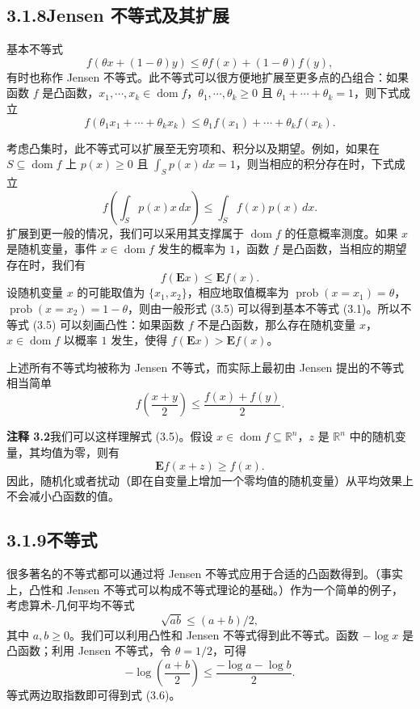 \documentclass[UTF8, 12pt, fontset=fandol, oneside]{ctexart}
\DeclareMathOperator{\dom}{dom}
\begin{document}
\subsection*{3.1.8\quad Jensen 不等式及其扩展}

基本不等式
\[
f(\theta x+(1-\theta)y)\leq \theta f(x)+(1-\theta)f(y),
\]
有时也称作 Jensen 不等式。此不等式可以很方便地扩展至更多点的凸组合：如果函数 $f$ 是凸函数，$x_1,\cdots,x_k\in\dom f$，$\theta_1,\cdots,\theta_k\geq0$ 且 $\theta_1+\cdots+\theta_k=1$，则下式成立
\[
f(\theta_1x_1+\cdots+\theta_kx_k)\leq \theta_1 f(x_1)+\cdots+\theta_k f(x_k).
\]

考虑凸集时，此不等式可以扩展至无穷项和、积分以及期望。例如，如果在 $S\subseteq\dom f$ 上 $p(x)\geq0$ 且 $\int_S p(x)\,dx=1$，则当相应的积分存在时，下式成立
\[
f\left(\int_S p(x)x\,dx\right)\leq \int_S f(x)p(x)\,dx.
\]
扩展到更一般的情况，我们可以采用其支撑属于 $\dom f$ 的任意概率测度。如果 $x$ 是随机变量，事件 $x\in\dom f$ 发生的概率为 $1$，函数 $f$ 是凸函数，当相应的期望存在时，我们有
\begin{equation}
f(\mathbf{E}x)\leq \mathbf{E}f(x).
\tag{3.5}
\end{equation}
设随机变量 $x$ 的可能取值为 $\{x_1,x_2\}$，相应地取值概率为 $\operatorname{prob}(x=x_1)=\theta$，$\operatorname{prob}(x=x_2)=1-\theta$，则由一般形式 (3.5) 可以得到基本不等式 (3.1)。所以不等式 (3.5) 可以刻画凸性：如果函数 $f$ 不是凸函数，那么存在随机变量 $x$，$x\in\dom f$ 以概率 $1$ 发生，使得 $f(\mathbf{E}x)>\mathbf{E}f(x)$。

上述所有不等式均被称为 Jensen 不等式，而实际上最初由 Jensen 提出的不等式相当简单
\[
f\left(\frac{x+y}{2}\right)\leq \frac{f(x)+f(y)}{2}.
\]

\noindent\textbf{注释 3.2}\quad 我们可以这样理解式 (3.5)。假设 $x\in\dom f\subseteq\mathbb{R}^n$，$z$ 是 $\mathbb{R}^n$ 中的随机变量，其均值为零，则有
\[
\mathbf{E}f(x+z)\geq f(x).
\]
因此，随机化或者扰动（即在自变量上增加一个零均值的随机变量）从平均效果上不会减小凸函数的值。

\subsection*{3.1.9\quad 不等式}

很多著名的不等式都可以通过将 Jensen 不等式应用于合适的凸函数得到。（事实上，凸性和 Jensen 不等式可以构成不等式理论的基础。）作为一个简单的例子，考虑算术-几何平均不等式
\begin{equation}
\sqrt{ab}\leq (a+b)/2,
\tag{3.6}
\end{equation}
其中 $a,b\geq0$。我们可以利用凸性和 Jensen 不等式得到此不等式。函数 $-\log x$ 是凸函数；利用 Jensen 不等式，令 $\theta=1/2$，可得
\[
-\log\left(\frac{a+b}{2}\right)\leq \frac{-\log a-\log b}{2}.
\]
等式两边取指数即可得到式 (3.6)。
\end{document}
